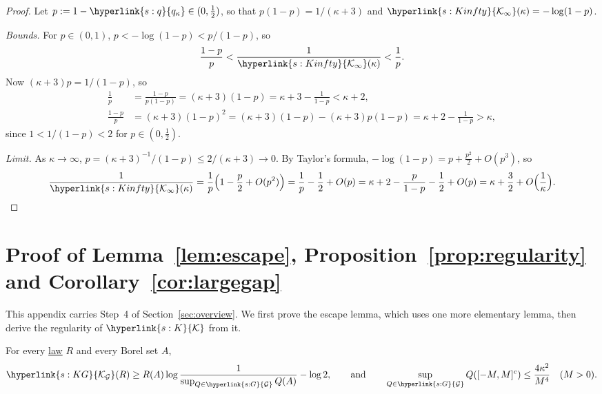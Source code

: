 \documentclass[11pt]{article}
\newcommand{\sy}[2]{{\hyperlink{#1}{#2}}}
\newcommand{\term}[2]{\hyperlink{#1}{#2}}
\newcommand{\Kc}{\sy{s:K}{\mathcal{K}}}
\newcommand{\Gk}{\sy{s:G}{\mathcal{G}}}
\newcommand{\KG}{\sy{s:KG}{\mathcal{K}_{\mathcal{G}}}}
\newcommand{\qk}{\sy{s:q}{q_{\kappa}}}
\newcommand{\Kinfty}{\sy{s:Kinfty}{\mathcal{K}_{\infty}}}
\begin{document}
\begin{proof}
Let $p:=1-\qk\in(0,\frac12)$, so that $p(1-p)=1/(\kappa+3)$ and $\Kinfty(\kappa)=-\log(1-p)$.

\emph{Bounds.} For $p\in(0,1)$, $p<-\log(1-p)<p/(1-p)$, so
\begin{equation*}
  \frac{1-p}p<\frac1{\Kinfty(\kappa)}<\frac1p .
\end{equation*}
Now $(\kappa+3)p=1/(1-p)$, so
\begin{align*}
  \frac1p&=\frac{1-p}{p(1-p)}=(\kappa+3)(1-p)=\kappa+3-\frac1{1-p}<\kappa+2,\\
  \frac{1-p}p&=(\kappa+3)(1-p)^2=(\kappa+3)(1-p)-(\kappa+3)p(1-p)=\kappa+2-\frac1{1-p}>\kappa,
\end{align*}
since $1<1/(1-p)<2$ for $p\in(0,\frac12)$.

\emph{Limit.} As $\kappa\to\infty$, $p=(\kappa+3)^{-1}/(1-p)\le2/(\kappa+3)\to0$. By Taylor's formula,
$-\log(1-p)=p+\frac{p^2}2+O(p^3)$, so
\begin{equation*}
  \frac1{\Kinfty(\kappa)}=\frac1p\Bigl(1-\frac p2+O(p^2)\Bigr)=\frac1p-\frac12+O(p)
  =\kappa+2-\frac p{1-p}-\frac12+O(p)=\kappa+\frac32+O\Bigl(\frac1\kappa\Bigr).
\end{equation*}
\end{proof}

\section{\texorpdfstring{Proof of Lemma~\ref{lem:escape}, Proposition~\ref{prop:regularity} and Corollary~\ref{cor:largegap}}{Proof of Lemma 8.1, Proposition 4.4 and Corollary 4.5}}\label{sec:proof-regularity}

This appendix carries Step~4 of Section~\ref{sec:overview}. We first prove the escape lemma, which uses one
more elementary lemma, then derive the regularity of $\Kc$ from it.

\begin{lemma}\label{lem:tail}
For every \term{w:law}{law} $R$ and every Borel set $A$,
\begin{equation*}
  \KG(R)\ge R(A)\log\frac1{\sup_{Q\in\Gk}Q(A)}-\log2,\qquad\text{and}\qquad\sup_{Q\in\Gk}Q([-M,M]^c)\le\frac{4\kappa^2}{M^4}\quad(M>0).
\end{equation*}
\end{lemma}
\end{document}
